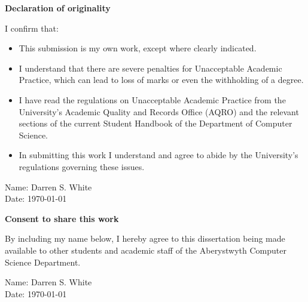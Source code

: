 \thispagestyle{empty}


\begin{center}
    {\LARGE\bf Declaration of originality}
\end{center}

I confirm that:

\begin{itemize}
\item{This submission is my own work, except where 
clearly indicated.}

\item{I understand that there are severe penalties for Unacceptable Academic Practice, which can lead to loss of marks or even the withholding of a degree.}
 
\item{I have read the regulations on Unacceptable Academic Practice from the University's Academic Quality and Records Office (AQRO) and the relevant sections of the current Student Handbook of the Department of Computer Science.}
 
\item{In submitting this work I understand and agree to abide by the University's regulations governing these issues.}
\end{itemize}

\vspace{2em}
Name: Darren S. White\\

\vspace{1em}
Date: \today\\

\vspace{1em}
\begin{center}
    {\LARGE\bf Consent to share this work}
\end{center}

By including my name below, I hereby agree to this dissertation being made available to other students and academic staff of the Aberystwyth Computer Science Department.  

\vspace{2em}
Name: Darren S. White\\

\vspace{1em}
Date: \today\\

